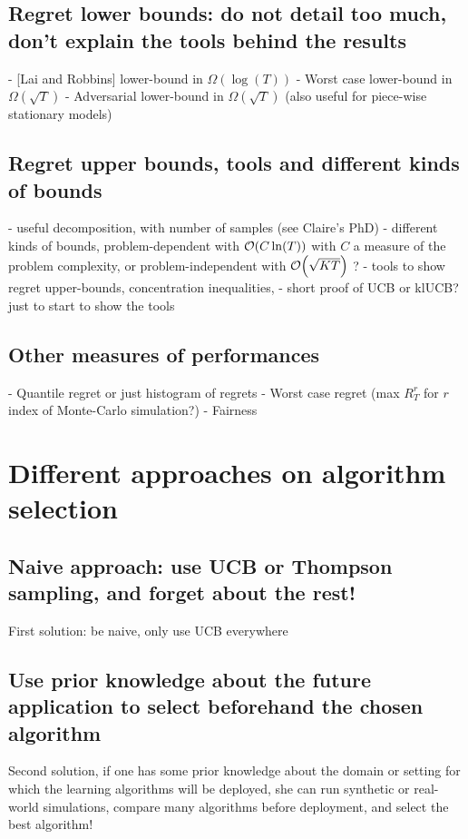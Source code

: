 \subsection{Regret lower bounds: do not detail too much, don't explain the tools behind the results}

- [Lai and Robbins] lower-bound in $\Omega(\log(T))$
- Worst case lower-bound in $\Omega(\sqrt{T})$
- Adversarial lower-bound in $\Omega(\sqrt{T})$ (also useful for piece-wise stationary models)


\subsection{Regret upper bounds, tools and different kinds of bounds}

- useful decomposition, with number of samples (see Claire's PhD)
- different kinds of bounds, problem-dependent with $\mathop{}\mathopen{}\mathcal{O}\mathopen{}\left(C \ln(T)\right)$ with $C$ a measure of the problem complexity, or problem-independent with $\mathop{}\mathopen{}\mathcal{O}\mathopen{}\left(\sqrt{KT}\right)$ ?
- tools to show regret upper-bounds, concentration inequalities,
- short proof of UCB or klUCB? just to start to show the tools


\subsection{Other measures of performances}

- Quantile regret or just histogram of regrets
- Worst case regret (max $R_T^{r}$ for $r$ index of Monte-Carlo simulation?)
- Fairness


\section{Different approaches on algorithm selection}
\label{sec:2:chooseYourPreferredBanditAlgorithm}

\subsection{Naive approach: use UCB or Thompson sampling, and forget about the rest!}
First solution: be naive, only use UCB everywhere

\subsection{Use prior knowledge about the future application to select beforehand the chosen algorithm}
Second solution, if one has some prior knowledge about the domain or setting for which the learning algorithms will be deployed, she can run synthetic or real-world simulations, compare many algorithms before deployment, and select the best algorithm!

